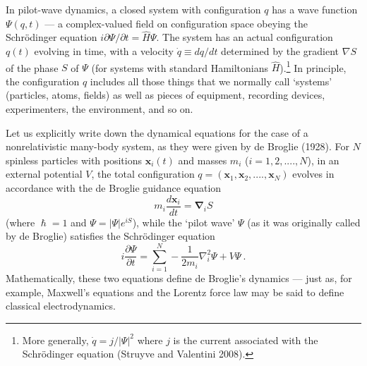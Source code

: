 \documentclass{article}%
\begin{document}
In pilot-wave dynamics, a closed system with configuration $q$ has a wave
function $\Psi(q,t)$ --- a complex-valued field on configuration space obeying
the Schr\"{o}dinger equation $i\partial\Psi/\partial t=\hat{H}\Psi$. The
system has an actual configuration $q(t)$ evolving in time, with a velocity
$\dot{q}\equiv dq/dt$ determined by the gradient $\nabla S$ of the phase $S$
of $\Psi$ (for systems with standard Hamiltonians $\hat{H}$).\footnote{More
generally, $\dot{q}=j/|\Psi|^{2}$ where $j$ is the current associated with the
Schr\"{o}dinger equation (Struyve and Valentini 2008).} In principle, the
configuration $q$ includes all those things that we normally call `systems'
(particles, atoms, fields) as well as pieces of equipment, recording devices,
experimenters, the environment, and so on.

Let us explicitly write down the dynamical equations for the case of a
nonrelativistic many-body system, as they were given by de Broglie (1928). For
$N$ spinless particles with positions $\mathbf{x}_{i}(t)$ and masses $m_{i}$
($i=1,2,....,N$), in an external potential $V$, the total configuration
$q=(\mathbf{x}_{1},\mathbf{x}_{2},....,\mathbf{x}_{N})$ evolves in accordance
with the de Broglie guidance equation%
\begin{equation}
m_{i}\frac{d\mathbf{x}_{i}}{dt}=\mathbf{\nabla}_{i}S \label{geqn}%
\end{equation}
(where $\hslash=1$ and $\Psi=\left\vert \Psi\right\vert e^{iS}$), while the
`pilot wave' $\Psi$ (as it was originally called by de Broglie) satisfies the
Schr\"{o}dinger equation%
\begin{equation}
i\frac{\partial\Psi}{\partial t}=\sum_{i=1}^{N}-\frac{1}{2m_{i}}\nabla_{i}%
^{2}\Psi+V\Psi\ . \label{Seqn}%
\end{equation}
Mathematically, these two equations define de Broglie's dynamics --- just as,
for example, Maxwell's equations and the Lorentz force law may be said to
define classical electrodynamics.
\end{document}
